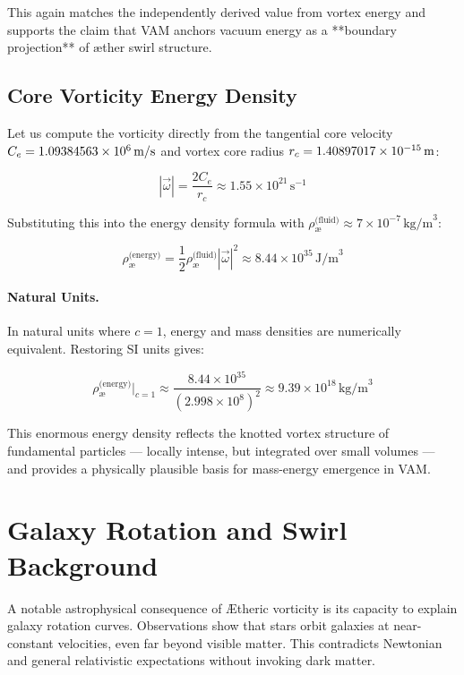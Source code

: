 \documentclass[12pt]{article}
\begin{document}
    This again matches the independently derived value from vortex energy and supports the claim that VAM anchors vacuum energy as a **boundary projection** of æther swirl structure.

    \subsection{Core Vorticity Energy Density}

    Let us compute the vorticity directly from the tangential core velocity \( C_e = 1.09384563 \times 10^{6} \, \text{m/s} \) and vortex core radius \( r_c = 1.40897017 \times 10^{-15} \, \text{m} \):

    \[
        |\vec{\omega}| = \frac{2 C_e}{r_c} \approx 1.55 \times 10^{21} \, \text{s}^{-1}
    \]

    Substituting this into the energy density formula with \( \rho_{\text{\ae}}^{\text{(fluid)}} \approx 7 \times 10^{-7} \, \text{kg/m}^3 \):

    \[
        \rho_{\text{\ae}}^{\text{(energy)}} = \frac{1}{2} \rho_{\text{\ae}}^{\text{(fluid)}} |\vec{\omega}|^2 \approx 8.44 \times 10^{35} \, \text{J/m}^3
    \]

    \paragraph{Natural Units.}
    In natural units where \( c = 1 \), energy and mass densities are numerically equivalent. Restoring SI units gives:

    \[
        \rho_{\text{\ae}}^{\text{(energy)}} \Big|_{c=1} \approx \frac{8.44 \times 10^{35}}{(2.998 \times 10^8)^2} \approx 9.39 \times 10^{18} \, \text{kg/m}^3
    \]

    This enormous energy density reflects the knotted vortex structure of fundamental particles — locally intense, but integrated over small volumes — and provides a physically plausible basis for mass-energy emergence in VAM.


    \section{Galaxy Rotation and Swirl Background}

    A notable astrophysical consequence of \AE{}theric vorticity is its capacity to explain galaxy rotation curves. Observations show that stars orbit galaxies at near-constant velocities, even far beyond visible matter. This contradicts Newtonian and general relativistic expectations without invoking dark matter.
\end{document}

